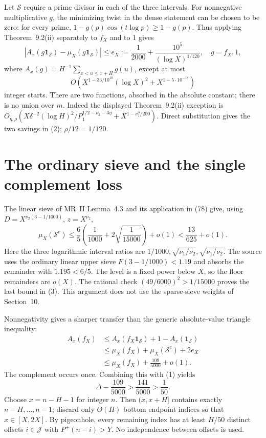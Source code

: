 \documentclass[11pt]{article}
\begin{document}
Let $\mathcal S$ require a prime divisor in each of the three intervals.
For nonnegative multiplicative $g$, the minimizing twist in the dense
statement can be chosen to be zero: for every prime,
$1-g(p)\cos(t\log p)\ge1-g(p)$.
Thus applying Theorem~9.2(ii) separately to $f_X$ and to $1$ gives
\[
 |A_x(g\mathbf1_{\mathcal S})-\mu_X(g\mathbf1_{\mathcal S})|
 \le e_X:=\frac1{2000}+\frac{10^5}{(\log X)^{1/120}},
 \quad g=f_X,1,
\]
where $A_x(g)=H^{-1}\sum_{x<u\le x+H}g(u)$, except at most
\[
 O\left(X^{1-33/10^{10}}(\log X)^2
            +X^{1-5\cdot10^{-18}}\right) \tag{2}
\]
integer starts. There are two functions, absorbed in the absolute constant;
there is no union over $m$.
Indeed the displayed Theorem~9.2(ii) exception is
$O_{\eta,\rho}(X\delta^{-2}(\log H)^2/P_1^{1/2-\nu_2-3\eta}
+X^{1-\nu_1^3/200})$.
Direct substitution gives the two savings in (2); $\rho/12=1/120$.

\section{The ordinary sieve and the single complement loss}
The linear sieve of MR~II Lemma~4.3 and its application in (78) give,
using $D=X^{\nu_2(3-1/1000)}$, $z=X^{\nu_2}$,
\[
 \mu_X(\mathcal S^c)
 \le\frac65\left(\frac1{1000}+2\sqrt{\frac1{15000}}\right)+o(1)
 <\frac{13}{625}+o(1). \tag{3}
\]
Here the three logarithmic interval ratios are
$1/1000,\sqrt{\nu_1/\nu_2},\sqrt{\nu_1/\nu_2}$.
The source uses the ordinary linear upper sieve $F(3-1/1000)<1.19$
and absorbs the remainder with $1.195<6/5$.
The level is a fixed power below $X$, so the floor remainders are $o(X)$.
The rational check $(49/6000)^2>1/15000$ proves the last bound in (3).
This argument does not use the sparse-sieve weights of Section~10.

Nonnegativity gives a sharper transfer than the generic absolute-value
triangle inequality:
\[
 \begin{aligned}
 A_x(f_X)&\le A_x(f_X\mathbf1_{\mathcal S})+1-A_x(\mathbf1_{\mathcal S})\\
 &\le\mu_X(f_X)+\mu_X(\mathcal S^c)+2e_X\\
 &\le\mu_X(f_X)+\frac{109}{5000}+o(1).
 \end{aligned}
\]
The complement occurs once. Combining this with (1) yields
\[
 \Delta-\frac{109}{5000}>
 \frac{141}{5000}>\frac1{50}. \tag{4}
\]
Choose $x=n-H-1$ for integer $n$. Then $(x,x+H]$ contains exactly
$n-H,\ldots,n-1$; discard only $O(H)$ bottom endpoint indices so that
$x\in[X,2X]$. By pigeonhole, every remaining index has at least $H/50$
distinct offsets $i\in\mathcal J$ with $P^+(n-i)>Y$.
No independence between offsets is used.
\end{document}
